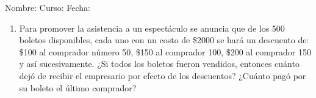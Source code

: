 \documentclass[fleqn]{article}
\newcommand{\LineaNombre}{%
\par
\vspace{\baselineskip}
Nombre:\hrulefill \; Curso: \underline{\hspace*{48pt}} \; Fecha: \underline{\hspace*{2.5cm}} \relax
\par}
\begin{document}
\LineaNombre
\begin{enumerate}
 \item Para promover la asistencia a un espectáculo se anuncia que de los 500 boletos disponibles, cada uno con un costo de \$2000 se hará un descuento de: \$100 al comprador número 50, \$150 al comprador 100, \$200 al comprador 150 y así sucesivamente. ¿Si todos los boletos fueron vendidos, entonces cuánto dejó de recibir el empresario por efecto de los descuentos? ¿Cuánto pagó por su boleto el último comprador? \noanswer
 \end{enumerate}
\end{document}
